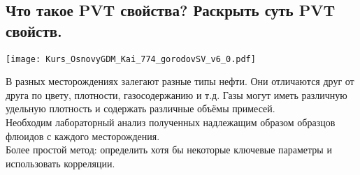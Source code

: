 

\subsection{Что такое PVT свойства? Раскрыть суть PVT свойств.}

\texttt{[image: Kurs\_OsnovyGDM\_Kai\_774\_gorodovSV\_v6\_0.pdf]}

В разных месторождениях залегают разные типы нефти.
Они отличаются друг от друга по цвету, плотности, газосодержанию и т.д.
Газы могут иметь различную удельную плотность и содержать различные объёмы примесей.
\\

Необходим лабораторный анализ полученных надлежащим образом образцов флюидов с каждого месторождения.
\\

Более простой метод: определить хотя бы некоторые ключевые параметры и использовать корреляции.

